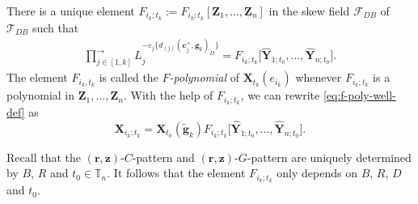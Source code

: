 \documentclass[10pt,a4paper]{amsart}
\numberwithin{equation}{section}
\begin{document}
\begin{Definition}
 There is a unique element $F_{i_k;t_k}:=F_{i_k;t_k}[\mathbf{Z}_1,\dots, \mathbf{Z}_n]$ in the skew field $\mathcal{F}_{DB}$ of~$\mathcal{T}_{DB}$ such that
 \begin{align}\label{eq:gupta-formula}
 \prod\limits^{\longrightarrow}_{j\in[1,k]}L_{j}^{-\varepsilon_{j}\{d_{(j)}(\mathbf{c}_{j}^{+},\mathbf{g}_{k})_D\}}=F_{i_k;t_k}\big[\hat{\mathbf{Y}}_{1;t_0},\dots, \hat{\mathbf{Y}}_{n;t_0}\big].
 \end{align}
 The element $F_{i_k,t_k}$ is called the {\it $F$-polynomial} of $\mathbf{X}_{t_k}(e_{i_k})$ whenever $F_{i_k;t_k}$ is a polynomial in $\mathbf{Z}_1,\dots,\mathbf{Z}_n$. With the help of $F_{i_k;t_k}$, we can rewrite \eqref{eq:f-poly-well-def} as
 \[
 \mathbf{X}_{i_k;t_k}=\mathbf{X}_{t_0}(\tilde{\mathbf{g}}_k)F_{i_k;t_k}\big[\hat{\mathbf{Y}}_{1;t_0},\dots, \hat{\mathbf{Y}}_{n;t_0}\big].
 \]

\end{Definition}
\begin{Remark}
 Recall that the $(\mathbf{r},\mathbf{z})$-$C$-pattern and $(\mathbf{r},\mathbf{z})$-$G$-pattern are uniquely determined by $B$, $R$ and $t_0\in \mathbb{T}_n$. It follows that the element $F_{i_k;t_k}$ only depends on $B$, $R$, $D$ and $t_0$.
\end{Remark}
\end{document}
